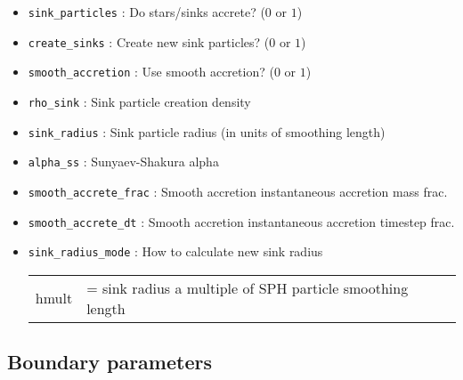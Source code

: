 \documentclass[a4paper]{article}
\newcommand{\var}[1]{\texttt{#1}}
\begin{document}
\begin{itemize}

\item \var{sink\_particles}   : Do stars/sinks accrete?  ($0$ or $1$)

\item \var{create\_sinks}     : Create new sink particles?  ($0$ or $1$)

\item \var{smooth\_accretion} : Use smooth accretion?  ($0$ or $1$)

\item \var{rho\_sink}         : Sink particle creation density

\item \var{sink\_radius}      : Sink particle radius (in units of smoothing length)

\item \var{alpha\_ss}         : Sunyaev-Shakura alpha

\item \var{smooth\_accrete\_frac} : Smooth accretion instantaneous accretion mass frac.

\item \var{smooth\_accrete\_dt} : Smooth accretion instantaneous accretion timestep frac.

\item \var{sink\_radius\_mode} : How to calculate new sink radius \\
\begin{tabular}{ll}
hmult   &= sink radius a multiple of SPH particle smoothing length
\end{tabular}


\end{itemize}


\subsection{Boundary parameters}
\end{document}
